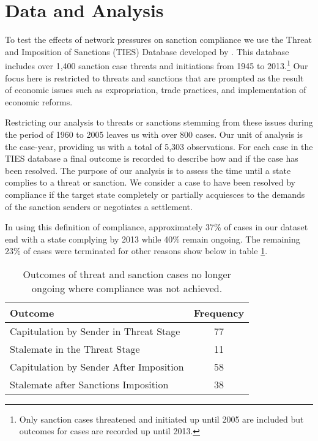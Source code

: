\section*{Data and Analysis}
\label{empirics}

To test the effects of network pressures on sanction compliance we use the Threat and Imposition of Sanctions (TIES) Database developed by \citet{morgan2009threat}. This database includes over 1,400 sanction case threats and initiations from 1945 to 2013.\footnote{Only sanction cases threatened and initiated up until 2005 are included but outcomes for cases are recorded up until 2013.} Our focus here is restricted to threats and sanctions that are prompted as the result of economic issues such as expropriation, trade practices, and implementation of economic reforms. 


Restricting our analysis to threats or sanctions stemming from these issues during the period of 1960 to 2005 leaves us with over 800 cases. Our unit of analysis is the case-year, providing us with a total of 5,303 observations. For each case in the TIES database a final outcome is recorded to describe how and if the case has been resolved. The purpose of our analysis is to assess the time until a state complies to a threat or sanction. We consider a case to have been resolved by compliance if the target state completely or partially acquiesces to the demands of the sanction senders or negotiates a settlement.
	
In using this definition of compliance, approximately 37\% of cases in our dataset end with a state complying by 2013 while 40\% remain ongoing. The remaining 23\% of cases were terminated for other reasons show below in table \ref{tab:termCases}.

\begin{table}[ht]
	\centering
	\begin{tabular}{lc}
		\hline\hline
		Outcome & Frequency \\
		\hline
		Capitulation by Sender in Threat Stage & 77 \\
		Stalemate in the Threat Stage & 11 \\		
		Capitulation by Sender After Imposition & 58 \\
		Stalemate after Sanctions Imposition & 38 \\
		\hline\hline
	\end{tabular}
	\caption{Outcomes of threat and sanction cases no longer ongoing where compliance was not achieved.}
	\label{tab:termCases}	
\end{table}
\FloatBarrier

